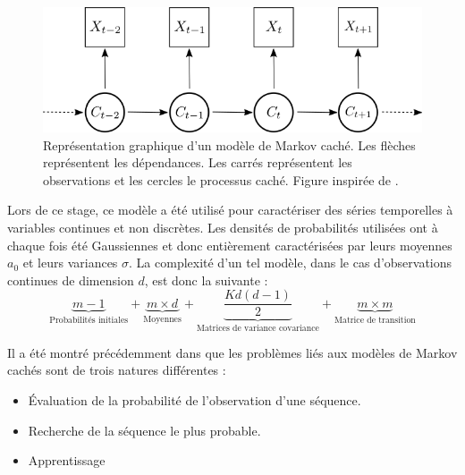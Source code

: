 \documentclass[12pt]{report}
\begin{document}
\begin{figure}[ht]
	\begin{center}
		\includegraphics[width=\textwidth]{Images/Models/HMM/HMM.png}
		\caption{Représentation graphique d'un modèle de Markov caché. Les flèches représentent les dépendances. Les carrés représentent les observations et les cercles le processus caché. Figure inspirée de \cite{zucchini_hidden_2017}.}
		\label{fig::HMM:HMM_Graph}
	\end{center}
\end{figure}


Lors de ce stage, ce modèle a été utilisé pour caractériser des séries temporelles à variables continues et non discrètes. Les densités de probabilités utilisées ont à chaque fois été Gaussiennes et donc entièrement caractérisées par leurs moyennes $a_0$ et leurs variances $\sigma$. La complexité d'un tel modèle, dans le cas d'observations continues de dimension $d$, est donc la suivante :
\begin{equation}
\underbrace{m-1}_\text{Probabilités initiales}  + \underbrace{m \times d}_\text{Moyennes}  +  \underbrace{\frac{Kd \left(d - 1\right)}{2}}_\text{Matrices de variance covariance} + \underbrace{m \times m}_\text{Matrice de transition}
\label{eq:Model_HMM_ParamNumber} 
\end{equation}

Il a été montré précédemment dans \cite{rabiner_tutorial_1989} que les problèmes liés aux modèles de Markov cachés sont de trois natures différentes : 
\begin{itemize}
	\item Évaluation de la probabilité de l’observation d’une séquence.
	\item Recherche de la séquence le plus probable.
	\item Apprentissage
\end{itemize}
\end{document}
